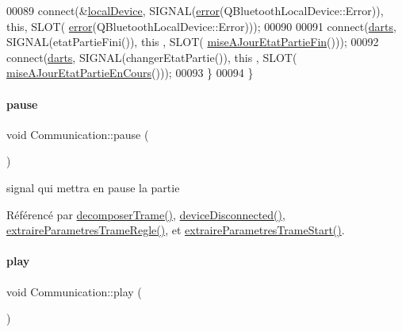 \begin{DoxyCode}
00089         connect(&\hyperlink{class_communication_a6281796eab7523bef6be1a766e0e906f}{localDevice}, SIGNAL(\hyperlink{class_communication_af95addb3c2bc178cfd7c92c6f94680a4}{error}(QBluetoothLocalDevice::Error)), \textcolor{keyword}{this}, SLOT(
      \hyperlink{class_communication_af95addb3c2bc178cfd7c92c6f94680a4}{error}(QBluetoothLocalDevice::Error)));
00090 
00091         connect(\hyperlink{class_communication_a494d609c206472041468e362d7cfc0e5}{darts}, SIGNAL(etatPartieFini()), \textcolor{keyword}{this} , SLOT(
      \hyperlink{class_communication_af6b9f4bf3b1df197ce20dccd9b78663f}{miseAJourEtatPartieFin}()));
00092         connect(\hyperlink{class_communication_a494d609c206472041468e362d7cfc0e5}{darts}, SIGNAL(changerEtatPartie()), \textcolor{keyword}{this} , SLOT(
      \hyperlink{class_communication_a1f90de1ff5f98de887b9c77664e105c7}{miseAJourEtatPartieEnCours}()));
00093     \}
00094 \}
\end{DoxyCode}
\mbox{\label{class_communication_a369c7aeadc5c5926eb701bdebe53972c}} 
\paragraph{\texorpdfstring{pause}{pause}}
{\footnotesize\ttfamily void Communication\+::pause (\begin{DoxyParamCaption}{ }\end{DoxyParamCaption})\hspace{0.3cm}{\ttfamily [signal]}}



signal qui mettra en pause la partie 



Référencé par \hyperlink{communication_8cpp_source_l00188}{decomposer\+Trame()}, \hyperlink{communication_8cpp_source_l00353}{device\+Disconnected()}, \hyperlink{communication_8cpp_source_l00279}{extraire\+Parametres\+Trame\+Regle()}, et \hyperlink{communication_8cpp_source_l00243}{extraire\+Parametres\+Trame\+Start()}.

\mbox{\label{class_communication_a2645730b88adec069200debe05d212c3}} 
\paragraph{\texorpdfstring{play}{play}}
{\footnotesize\ttfamily void Communication\+::play (\begin{DoxyParamCaption}{ }\end{DoxyParamCaption})\hspace{0.3cm}{\ttfamily [signal]}}



